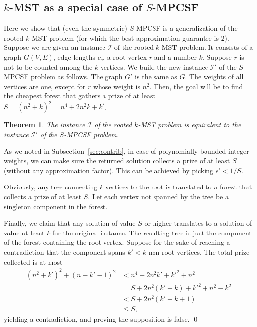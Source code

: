 \documentclass[extras,11pt]{article} \usepackage{fullpage}
\theoremstyle{mytheorem}
\newtheorem{theorem}{Theorem}
\renewenvironment{proof}{\par\noindent{\bf Proof.}\hspace{0.5em}}
    {\hfill\qed\vspace{1ex}}
\newcommand{\eps}{\epsilon}
\begin{document}
\subsection{$k$-MST as a special case of $S$-MPCSF}\label{sec:kmst}
Here we show that (even the symmetric) $S$-MPCSF is a generalization of the rooted $k$-MST problem (for which the best approximation guarantee is $2$).
Suppose we are given an instance $\mathcal{I}$ of the rooted $k$-MST problem.
It consists of a graph $G(V,E)$, edge lengths $c_e$, a root vertex $r$ and a number $k$.
Suppose $r$ is not to be counted among the $k$ vertices.
We build the new instance $\mathcal{I}'$ of the $S$-MPCSF problem as follows.
The graph $G'$ is the same as $G$.
The weights of all vertices are one, except for $r$ whose weight is $n^2$.
Then, the goal will be to find the cheapest forest that gathers a prize of at least $S=(n^2+k)^2=n^4+2n^2k+k^2$.

\begin{theorem}\label{thm:special-case}
The instance $\mathcal{I}$ of the rooted $k$-MST problem
is equivalent to
the instance $\mathcal{I}'$ of the $S$-MPCSF problem.
\end{theorem}
\begin{proof}
As we noted in Subsection~\ref{sec:contrib},
in case of polynomially bounded integer weights,
we can make sure the returned solution collects a prize of at least $S$ (without any approximation factor).
This can be achieved by picking $\eps' < 1/S$.

Obviously, any tree connecting $k$ vertices to the root is translated
to a forest that collects a prize of at least $S$.
Let each vertex not spanned by the tree be a singleton component in the forest.

Finally, we claim that any solution of value $S$ or higher translates to a solution of value at least $k$ for the original instance.
The resulting tree is just the component of the forest containing the root vertex.
Suppose for the sake of reaching a contradiction that the component spans $k'<k$ non-root vertices.
The total prize collected is at most
\begin{align*}
(n^2+k')^2 + (n-k'-1)^2  &< n^4+2n^2k'+k'^2+n^2 \\
                         &= S + 2n^2(k'-k) +k'^2 + n^2 - k^2\\
                         &< S+2n^2(k'-k+1) \\
                         &\leq S,
\end{align*}
yielding a contradiction, and proving the supposition is false.
\end{proof}
\end{document}
